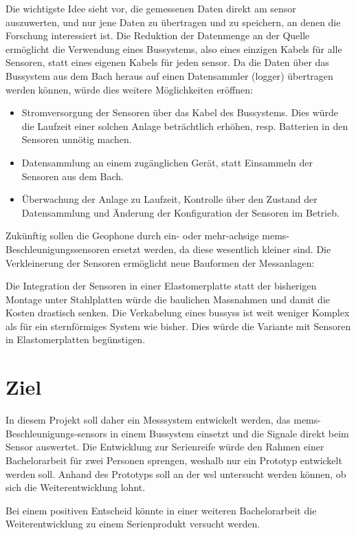 Die wichtigste Idee sieht vor, die gemessenen Daten direkt am \gls{sensor} auszuwerten, und nur jene Daten zu übertragen und zu speichern, an denen die Forschung interessiert ist. Die Reduktion der Datenmenge an der Quelle ermöglicht die Verwendung eines Bussystems, also eines einzigen Kabels für alle Sensoren, statt eines eigenen Kabels für jeden \gls{sensor}. Da die Daten über das Bussystem aus dem Bach heraus auf einen Datensammler (\gls{logger}) übertragen werden können, würde dies weitere Möglichkeiten eröffnen:
\begin{itemize}
\item Stromversorgung der Sensoren über das Kabel des Bussystems. Dies würde die Laufzeit einer solchen Anlage beträchtlich erhöhen, resp. Batterien in den Sensoren unnötig machen.
\item Datensammlung an einem zugänglichen Gerät, statt Einsammeln der Sensoren aus dem Bach.
\item Überwachung der Anlage zu Laufzeit, Kontrolle über den Zustand der Datensammlung und Änderung der Konfiguration der Sensoren im Betrieb.
\end{itemize}

Zukünftig sollen die Geophone durch ein- oder mehr-achsige \gls{mems}-Beschleunigungssensoren ersetzt werden, da diese wesentlich kleiner sind. Die Verkleinerung der Sensoren ermöglicht neue Bauformen der Messanlagen:

Die Integration der Sensoren in einer Elastomerplatte statt der bisherigen Montage unter Stahlplatten würde die baulichen Massnahmen und damit die Kosten drastisch senken. Die Verkabelung eines \gls{bussys}s ist weit weniger Komplex als für ein sternförmiges System wie bisher. Dies würde die Variante mit Sensoren in Elastomerplatten begünstigen.

\section{Ziel}
In diesem Projekt soll daher ein Messsystem entwickelt werden, das \gls{mems}-Beschleunigungs-\glspl{sensor} in einem Bussystem einsetzt und die Signale direkt beim Sensor auswertet. Die Entwicklung zur Serienreife würde den Rahmen einer Bachelorarbeit für zwei Personen sprengen, weshalb nur ein Prototyp entwickelt werden soll. Anhand des Prototyps soll an der \gls{wsl} untersucht werden können, ob sich die Weiterentwicklung lohnt. 

Bei einem positiven Entscheid könnte in einer weiteren Bachelorarbeit die Weiterentwicklung zu einem Serienprodukt versucht werden.

